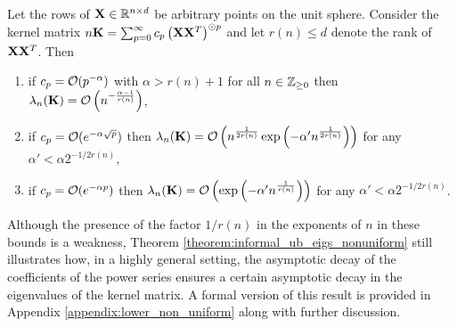 \begin{theorem}[Informal] \label{theorem:informal_ub_eigs_nonuniform}
    Let the rows of $\mathbf{X}\in \mathbb{R}^{n \times d}$ be arbitrary points on the unit sphere. Consider the kernel matrix $n\mathbf{K} = \sum_{p=0}^{\infty} c_p \left(\mathbf{X} \mathbf{X}^T \right)^{\odot p}$ and let $r(n)\leq d$ denote the rank of $\mathbf{X}\mathbf{X}^T$. Then
    \begin{enumerate}
        \item 
        if $c_p = \mathcal{O}(p^{-\alpha})$ with $\alpha > r(n)+1$ for all $n \in \mathbb{Z}_{\geq 0}$ then $\lambda_{n}(\mathbf{K}) = \mathcal{O}\left(n^{-\frac{\alpha-1}{r(n)}}\right)$,
        \item 
        if $c_p = \mathcal{O}(e^{-\alpha \sqrt{p}})$ then $\lambda_{n}(\mathbf{K}) = \mathcal{O} \left(n^{\frac{1}{2r(n)}} \exp \left(-\alpha' n^{\frac{1}{2r(n)}} \right) \right)$ for any $\alpha' < \alpha 2^{-1/2r(n)}$,
        \item 
        if $c_p = \mathcal{O}(e^{-\alpha p})$ then $\lambda_{n}(\mathbf{K}) = \mathcal{O}\left(\exp\left(-\alpha' n^{\frac{1}{r(n)}}\right)\right)$ for any $\alpha' < \alpha 2^{-1/2r(n)}$. 
    \end{enumerate}
\end{theorem}

Although the presence of the factor $1/r(n)$ in the exponents of $n$ in these bounds is a weakness, Theorem \ref{theorem:informal_ub_eigs_nonuniform} still illustrates how, in a highly general setting, the asymptotic decay of the coefficients of the power series ensures a certain asymptotic decay in the eigenvalues of the kernel matrix. A formal version of this result is provided in Appendix \ref{appendix:lower_non_uniform} along with further discussion.
